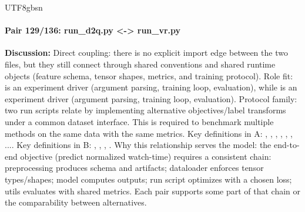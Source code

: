 \documentclass[11pt]{article}
\begin{document}
\begin{CJK*}{UTF8}{gbsn}
\paragraph{Pair 129/136: run\_d2q.py <-> run\_vr.py}
\textbf{Discussion:} Direct coupling: there is no explicit import edge between the two files, but they still connect through shared conventions and shared runtime objects (feature schema, tensor shapes, metrics, and training protocol). Role fit: \texttt{} is an experiment driver (argument parsing, training loop, evaluation), while \texttt{} is an experiment driver (argument parsing, training loop, evaluation). Protocol family: two run scripts relate by implementing alternative objectives/label transforms under a common dataset interface. This is required to benchmark multiple methods on the same data with the same metrics. Key definitions in A: \texttt{}, \texttt{}, \texttt{}, \texttt{}, \texttt{}, \texttt{}, .... Key definitions in B: \texttt{}, \texttt{}, \texttt{}, \texttt{}. Why this relationship serves the model: the end-to-end objective (predict normalized watch-time) requires a consistent chain: preprocessing produces schema and artifacts; dataloader enforces tensor types/shapes; model computes outputs; run script optimizes with a chosen loss; utils evaluates with shared metrics. Each pair supports some part of that chain or the comparability between alternatives.


\end{CJK*}
\end{document}
